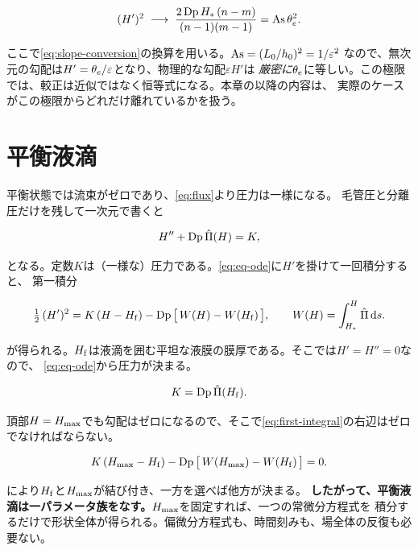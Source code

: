 \begin{equation}\label{eq:slope-limit}
  (H')^{2} \;\longrightarrow\;
    \frac{2\,\mathrm{Dp}\,H_{*}\,(n-m)}{(n-1)(m-1)} = \mathrm{As}\,\theta_{e}^{2}.
\end{equation}

ここで\cref{eq:slope-conversion}の換算を用いる。$\mathrm{As} = (L_0/h_0)^{2} = 1/\varepsilon^{2}$
なので、無次元の勾配は$H' = \theta_{e}/\varepsilon$となり、物理的な勾配$\varepsilon H'$は
\emph{厳密に}$\theta_{e}$に等しい。この極限では、較正は近似ではなく恒等式になる。本章の以降の内容は、
実際のケースがこの極限からどれだけ離れているかを扱う。

\section{平衡液滴}
\label{sec:wetting:equilibrium}

平衡状態では流束がゼロであり、\cref{eq:flux}より圧力は一様になる。
毛管圧と分離圧だけを残して一次元で書くと

\begin{equation}\label{eq:eq-ode}
  H'' + \mathrm{Dp}\,\hat{\Pi}(H) = K,
\end{equation}

となる。定数$K$は（一様な）圧力である。\cref{eq:eq-ode}に$H'$を掛けて一回積分すると、
第一積分

\begin{equation}\label{eq:first-integral}
  \tfrac{1}{2}\,(H')^{2}
    = K\,(H - H_{\mathrm{f}}) - \mathrm{Dp}\,\bigl[\,W(H) - W(H_{\mathrm{f}})\,\bigr],
  \qquad
  W(H) = \int_{H_{*}}^{H} \hat{\Pi}\,\mathrm{d}s .
\end{equation}

が得られる。$H_{\mathrm{f}}$は液滴を囲む平坦な液膜の膜厚である。そこでは$H' = H'' = 0$なので、
\cref{eq:eq-ode}から圧力が決まる。

\begin{equation}\label{eq:K-from-Hf}
  K = \mathrm{Dp}\,\hat{\Pi}(H_{\mathrm{f}}).
\end{equation}

頂部$H = H_{\mathrm{max}}$でも勾配はゼロになるので、そこで\cref{eq:first-integral}の右辺はゼロでなければならない。

\begin{equation}\label{eq:Hf-Hmax}
  K\,(H_{\mathrm{max}} - H_{\mathrm{f}}) - \mathrm{Dp}\,\bigl[\,W(H_{\mathrm{max}}) - W(H_{\mathrm{f}})\,\bigr] = 0 .
\end{equation}

により$H_{\mathrm{f}}$と$H_{\mathrm{max}}$が結び付き、一方を選べば他方が決まる。
\textbf{したがって、平衡液滴は一パラメータ族をなす。}$H_{\mathrm{max}}$を固定すれば、一つの常微分方程式を
積分するだけで形状全体が得られる。偏微分方程式も、時間刻みも、場全体の反復も必要ない。

